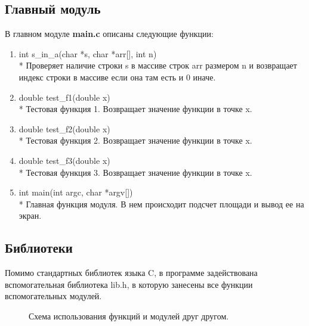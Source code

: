 \documentclass[a4paper,12pt,titlepage,finall]{article}
\begin{document}
\subsection{Главный модуль}

В главном модуле \textbf{main.c} описаны следующие функции:

\begin{enumerate}
    \item int s\_in\_a(char *s, char *arr[], int n)
    \\* Проверяет наличие строки s в массиве строк arr размером n и возвращает индекс строки в массиве если она там есть и 0 иначе.
    \item double test\_f1(double x)
    \\* Тестовая функция 1. Возвращает значение функции в точке x.
    \item double test\_f2(double x)
    \\* Тестовая функция 2. Возвращает значение функции в точке x.
    \item double test\_f3(double x)
    \\* Тестовая функция 3. Возвращает значение функции в точке x.
    \item int main(int argc, char *argv[])
    \\* Главная функция модуля. В нем происходит подсчет площади и вывод ее на экран.
\end{enumerate}

\subsection{Библиотеки}

Помимо стандартных библиотек языка C, в программе задействована вспомогательная библиотека lib.h, в которую занесены все функции вспомогательных модулей.

\begin{figure}[h]
\caption{Схема использования функций и модулей друг другом.}
\label{fig:image}
\end{figure}
\end{document}
